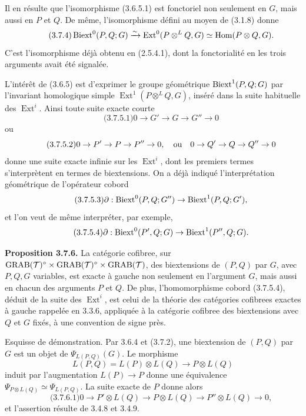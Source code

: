 \documentclass[11pt]{article}
\providecommand{\Hom}{\operatorname{Hom}}
\providecommand{\Ext}{\operatorname{Ext}}
\begin{document}
Il en résulte que l'isomorphisme (3.6.5.1) est fonctoriel non seulement en \(G\), mais aussi en \(P\) et \(Q\).  De même, l'isomorphisme défini au moyen de (3.1.8) donne
\begin{equation}\qquad\text{(3.7.4)}
 \Biext^0(P,Q;G)\xrightarrow{\sim}
 \Ext^0(P\otimes^L Q,G)\simeq\Hom(P\otimes Q,G).
\end{equation}
C'est l'isomorphisme déjà obtenu en (2.5.4.1), dont la fonctorialité en les trois arguments avait été signalée.

L'intérêt de (3.6.5) est d'exprimer le groupe géométrique \(\operatorname{Biext}^1(P,Q;G)\) par l'invariant homologique simple \(\Ext^1(P\otimes^L Q,G)\), inséré dans la suite habituelle des \(\Ext^i\).  Ainsi toute suite exacte courte
\begin{equation}\qquad\text{(3.7.5.1)}
        0\to G'\to G\to G''\to0
\end{equation}
ou
\begin{equation}\qquad\text{(3.7.5.2)}
        0\to P'\to P\to P''\to0,
        \quad\hbox{ou}\quad
        0\to Q'\to Q\to Q''\to0
\end{equation}
donne une suite exacte infinie sur les \(\Ext^i\), dont les premiers termes s'interprètent en termes de biextensions.  On a déjà indiqué l'interprétation géométrique de l'opérateur cobord
\begin{equation}\qquad\text{(3.7.5.3)}
 \partial:\operatorname{Biext}^0(P,Q;G'')\to\operatorname{Biext}^1(P,Q;G'),
\end{equation}
et l'on veut de même interpréter, par exemple,
\begin{equation}\qquad\text{(3.7.5.4)}
 \partial:\operatorname{Biext}^0(P',Q;G)\to\operatorname{Biext}^1(P'',Q;G).
\end{equation}

\textbf{Proposition 3.7.6.}  La catégorie cofibree, sur
\(\operatorname{GRAB}(\mathcal T)^{\circ}\times\operatorname{GRAB}(\mathcal T)^{\circ}\times\operatorname{GRAB}(\mathcal T)\), des biextensions de \((P,Q)\) par \(G\), avec \(P,Q,G\) variables, est exacte à gauche non seulement en l'argument \(G\), mais aussi en chacun des arguments \(P\) et \(Q\).  De plus, l'homomorphisme cobord (3.7.5.4), déduit de la suite des \(\Ext^i\), est celui de la théorie des catégories cofibrees exactes à gauche rappelée en 3.3.6, appliquée à la catégorie cofibree des biextensions avec \(Q\) et \(G\) fixés, à une convention de signe près.

Esquisse de démonstration.  Par 3.6.4 et (3.7.2), une biextension de \((P,Q)\) par \(G\) est un objet de \(\Psi_{L(P,Q)}(G)\).  Le morphisme
\[
        L(P,Q)=L(P)\otimes L(Q)\to P\otimes L(Q)
\]
induit par l'augmentation \(L(P)\to P\) donne une équivalence \(\Psi_{P\otimes L(Q)}\simeq\Psi_{L(P,Q)}\).  La suite exacte de \(P\) donne alors
\begin{equation}\qquad\text{(3.7.6.1)}
        0\to P'\otimes L(Q)\to P\otimes L(Q)\to P''\otimes L(Q)\to0,
\end{equation}
et l'assertion résulte de 3.4.8 et 3.4.9.
\end{document}
